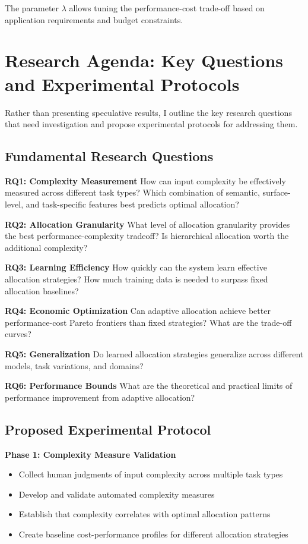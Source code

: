 \documentclass[11pt,a4paper]{article}
\begin{document}
The parameter $\lambda$ allows tuning the performance-cost trade-off based on application requirements and budget constraints.

\section{Research Agenda: Key Questions and Experimental Protocols}

Rather than presenting speculative results, I outline the key research questions that need investigation and propose experimental protocols for addressing them.

\subsection{Fundamental Research Questions}

\textbf{RQ1: Complexity Measurement}
How can input complexity be effectively measured across different task types? Which combination of semantic, surface-level, and task-specific features best predicts optimal allocation?

\textbf{RQ2: Allocation Granularity}
What level of allocation granularity provides the best performance-complexity tradeoff? Is hierarchical allocation worth the additional complexity?

\textbf{RQ3: Learning Efficiency}
How quickly can the system learn effective allocation strategies? How much training data is needed to surpass fixed allocation baselines?

\textbf{RQ4: Economic Optimization}
Can adaptive allocation achieve better performance-cost Pareto frontiers than fixed strategies? What are the trade-off curves?

\textbf{RQ5: Generalization}
Do learned allocation strategies generalize across different models, task variations, and domains?

\textbf{RQ6: Performance Bounds}
What are the theoretical and practical limits of performance improvement from adaptive allocation?

\subsection{Proposed Experimental Protocol}

\textbf{Phase 1: Complexity Measure Validation}
\begin{itemize}
\item Collect human judgments of input complexity across multiple task types
\item Develop and validate automated complexity measures
\item Establish that complexity correlates with optimal allocation patterns
\item Create baseline cost-performance profiles for different allocation strategies
\end{itemize}
\end{document}
